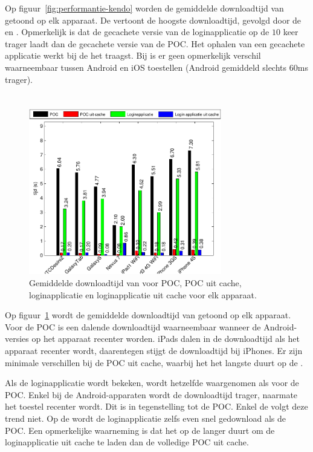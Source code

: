 Op figuur~\ref{fig:performantie-kendo} worden de gemiddelde downloadtijd van \kendo{} getoond op elk apparaat.
De \gtab{} vertoont de hoogste downloadtijd,  gevolgd door de \iphoneiii{} en \htc.
Opmerkelijk is dat de gecachete versie van de loginapplicatie op de \nexus{} $10$ keer trager laadt dan de gecachete versie van de POC.
Het ophalen van een gecachete applicatie werkt bij de \gs{} het traagst.
Bij \kendo{} is er geen opmerkelijk verschil waarneembaar tussen Android en iOS toestellen (Android gemiddeld slechts $60$ms trager).


\section{\jqm}
\label{app:performantie-jqm}

\begin{figure}
  \centering
  \includegraphics[width=0.75\textwidth]{figuren/performance-jquery.pdf}
  \caption{Gemiddelde downloadtijd van \jqm{} voor POC,  POC uit cache, loginapplicatie en loginapplicatie uit cache voor elk apparaat.}
  \label{fig:performantie-jqm}
\end{figure}

Op figuur~\ref{fig:performantie-jqm} wordt de gemiddelde downloadtijd van \jqm{} getoond op elk apparaat.
Voor de POC is een dalende downloadtijd waarneembaar wanneer de Android-versies op het apparaat recenter worden.
iPads dalen in de downloadtijd als het apparaat recenter wordt, daarentegen stijgt de downloadtijd bij iPhones.
Er zijn minimale verschillen bij de POC uit cache, waarbij het het langste duurt op de \iphoneiv{}.

Als de loginapplicatie wordt bekeken, wordt hetzelfde waargenomen als voor de POC.
Enkel bij de Android-apparaten wordt de downloadtijd trager, naarmate het toestel recenter wordt. 
Dit is in tegenstelling tot de POC.
Enkel de \nexus{} volgt deze trend niet.
Op de \nexus{} wordt de loginapplicatie zelfs even snel gedownload als de POC.
Een opmerkelijke waarneming is dat het op de \nexus{} langer duurt om de loginapplicatie uit cache te laden dan de volledige POC uit cache.

